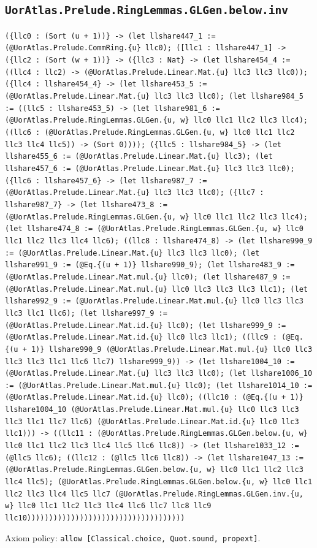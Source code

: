 \documentclass[11pt]{article}
\begin{document}
\subsection*{\texttt{UorAtlas.Prelude.RingLemmas.GLGen.below.inv}}
\noindent\texttt{(\{llc0 : (Sort (u + 1))\} -> (let llshare447\_1 := (@UorAtlas.Prelude.CommRing.\{u\} llc0); ([llc1 : llshare447\_1] -> (\{llc2 : (Sort (w + 1))\} -> (\{llc3 : Nat\} -> (let llshare454\_4 := ((llc4 : llc2) -> (@UorAtlas.Prelude.Linear.Mat.\{u\} llc3 llc3 llc0)); (\{llc4 : llshare454\_4\} -> (let llshare453\_5 := (@UorAtlas.Prelude.Linear.Mat.\{u\} llc3 llc3 llc0); (let llshare984\_5 := ((llc5 : llshare453\_5) -> (let llshare981\_6 := (@UorAtlas.Prelude.RingLemmas.GLGen.\{u, w\} llc0 llc1 llc2 llc3 llc4); ((llc6 : (@UorAtlas.Prelude.RingLemmas.GLGen.\{u, w\} llc0 llc1 llc2 llc3 llc4 llc5)) -> (Sort 0)))); (\{llc5 : llshare984\_5\} -> (let llshare455\_6 := (@UorAtlas.Prelude.Linear.Mat.\{u\} llc3); (let llshare457\_6 := (@UorAtlas.Prelude.Linear.Mat.\{u\} llc3 llc3 llc0); (\{llc6 : llshare457\_6\} -> (let llshare987\_7 := (@UorAtlas.Prelude.Linear.Mat.\{u\} llc3 llc3 llc0); (\{llc7 : llshare987\_7\} -> (let llshare473\_8 := (@UorAtlas.Prelude.RingLemmas.GLGen.\{u, w\} llc0 llc1 llc2 llc3 llc4); (let llshare474\_8 := (@UorAtlas.Prelude.RingLemmas.GLGen.\{u, w\} llc0 llc1 llc2 llc3 llc4 llc6); ((llc8 : llshare474\_8) -> (let llshare990\_9 := (@UorAtlas.Prelude.Linear.Mat.\{u\} llc3 llc3 llc0); (let llshare991\_9 := (@Eq.\{(u + 1)\} llshare990\_9); (let llshare483\_9 := (@UorAtlas.Prelude.Linear.Mat.mul.\{u\} llc0); (let llshare487\_9 := (@UorAtlas.Prelude.Linear.Mat.mul.\{u\} llc0 llc3 llc3 llc3 llc1); (let llshare992\_9 := (@UorAtlas.Prelude.Linear.Mat.mul.\{u\} llc0 llc3 llc3 llc3 llc1 llc6); (let llshare997\_9 := (@UorAtlas.Prelude.Linear.Mat.id.\{u\} llc0); (let llshare999\_9 := (@UorAtlas.Prelude.Linear.Mat.id.\{u\} llc0 llc3 llc1); ((llc9 : (@Eq.\{(u + 1)\} llshare990\_9 (@UorAtlas.Prelude.Linear.Mat.mul.\{u\} llc0 llc3 llc3 llc3 llc1 llc6 llc7) llshare999\_9)) -> (let llshare1004\_10 := (@UorAtlas.Prelude.Linear.Mat.\{u\} llc3 llc3 llc0); (let llshare1006\_10 := (@UorAtlas.Prelude.Linear.Mat.mul.\{u\} llc0); (let llshare1014\_10 := (@UorAtlas.Prelude.Linear.Mat.id.\{u\} llc0); ((llc10 : (@Eq.\{(u + 1)\} llshare1004\_10 (@UorAtlas.Prelude.Linear.Mat.mul.\{u\} llc0 llc3 llc3 llc3 llc1 llc7 llc6) (@UorAtlas.Prelude.Linear.Mat.id.\{u\} llc0 llc3 llc1))) -> ((llc11 : (@UorAtlas.Prelude.RingLemmas.GLGen.below.\{u, w\} llc0 llc1 llc2 llc3 llc4 llc5 llc6 llc8)) -> (let llshare1033\_12 := (@llc5 llc6); ((llc12 : (@llc5 llc6 llc8)) -> (let llshare1047\_13 := (@UorAtlas.Prelude.RingLemmas.GLGen.below.\{u, w\} llc0 llc1 llc2 llc3 llc4 llc5); (@UorAtlas.Prelude.RingLemmas.GLGen.below.\{u, w\} llc0 llc1 llc2 llc3 llc4 llc5 llc7 (@UorAtlas.Prelude.RingLemmas.GLGen.inv.\{u, w\} llc0 llc1 llc2 llc3 llc4 llc6 llc7 llc8 llc9 llc10))))))))))))))))))))))))))))))))))))}\par
\noindent Axiom policy: \texttt{allow [Classical.choice, Quot.sound, propext]}.\par
\end{document}
